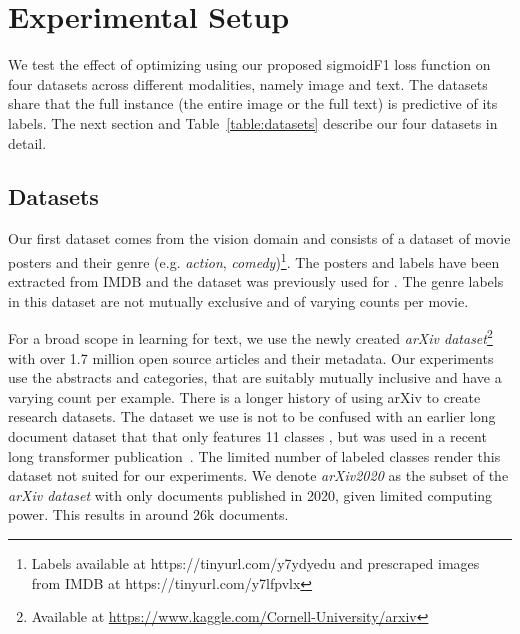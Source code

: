 
\section{Experimental Setup}
\label{sec:orgb44ba25}

We test the effect of optimizing using our proposed sigmoidF1 loss function on four datasets across different modalities, namely image and text. %
The datasets share that the full instance (the entire image or the full text) is predictive of its labels. The next section and Table~\ref{table:datasets} describe our four datasets in detail.


\subsection{Datasets}


Our first dataset comes from the vision domain and consists of a dataset of movie posters and their genre (e.g. \emph{action}, \emph{comedy})\footnote{Labels available at https://tinyurl.com/y7ydyedu and prescraped images from IMDB at https://tinyurl.com/y7lfpvlx}. The posters and labels have been extracted from IMDB and the dataset was previously used for . The genre labels in this dataset are not mutually exclusive and of varying counts per movie. 

For a broad scope in learning for text, we use the newly created \emph{arXiv dataset}\footnote{Available at \url{https://www.kaggle.com/Cornell-University/arxiv}} with over 1.7 million open source articles and their metadata. Our experiments use the abstracts and categories, that are suitably mutually inclusive and have a varying count per example. There is a longer history of using arXiv to create research datasets. The dataset we use is not to be confused with an earlier long document dataset that that only features 11 classes \cite{oldarXiv}, but was used in a recent long transformer publication~\cite{bigBird}. The limited number of labeled classes render this dataset not suited for our experiments.  We denote \textit{arXiv2020} as the subset of the \emph{arXiv dataset} with only documents published in 2020, given limited computing power. This results in around 26k documents.

